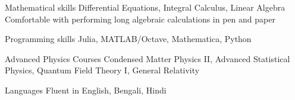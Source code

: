 

\begin{cvskills}


  
  \cvskill
	{Mathematical skills} %
	{Differential Equations, Integral Calculus, Linear Algebra}
  \cvskill
	{}
	{Comfortable with performing long algebraic calculations in pen and paper} %

  \cvskill
    {Programming skills} %
    {Julia, MATLAB/Octave, Mathematica, Python} %

  \cvskill
{Advanced Physics Courses} %
{Condensed Matter Physics II, Advanced Statistical Physics, Quantum Field Theory I, General Relativity} %

  \cvskill
    {Languages} %
    {Fluent in English, Bengali, Hindi} %

\end{cvskills}
